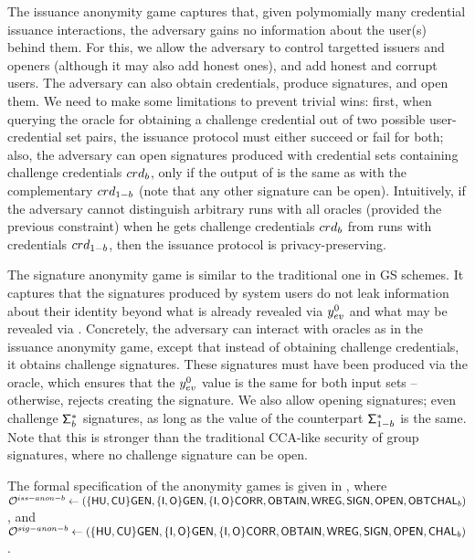 The issuance anonymity game captures that, given polymomially many
credential issuance interactions, the adversary gains no information about the
user(s) behind them. For this, we allow the adversary to control targetted
issuers and openers (although it may also add honest ones), and add honest and
corrupt users. The adversary can also obtain credentials, produce signatures,
and open them. We need to make some limitations to prevent trivial wins: first,
when querying the oracle for obtaining a challenge credential out of two
possible user-credential set pairs, the issuance protocol must either succeed or
fail for both; also, the adversary can open signatures produced with credential
sets containing challenge credentials $crd_b$, only if the output of \Open is
the same as with the complementary $crd_{1-b}$ 
 (note that any other signature
can be open).
Intuitively, if the adversary cannot distinguish arbitrary runs with all oracles
(provided the previous constraint) when he gets challenge credentials $crd_b$
from runs with credentials $crd_{1-b}$, then the issuance protocol is
privacy-preserving.

The signature anonymity game is similar to the traditional one in GS schemes.
It captures that the signatures produced by system users do not leak information
about their identity beyond what is already revealed via $y_{ev}^0$ and what
may be revealed via \yinsp. Concretely, the adversary can interact with oracles
as in the issuance anonymity game, except that instead of obtaining challenge
credentials, it obtains challenge signatures. These signatures must have been
produced via the \CHALb oracle, which ensures that the $y_{ev}^0$ value is the
same for both input sets -- otherwise, rejects creating the signature. We also
allow opening signatures; even challenge $\mathsf{\Sigma}^*_b$ signatures, as long as the
\yinsp value of the counterpart $\mathsf{\Sigma}^*_{1-b}$ is the same. Note that this is
stronger than the traditional CCA-like security of group signatures, where no
challenge signature can be open.

The formal specification of the anonymity games is given in
, where
$\mathcal{O}^{iss-anon-b} \gets (\lbrace\mathsf{HU},\mathsf{CU}\rbrace\mathsf{GEN},\lbrace\mathsf{I},\mathsf{O}\rbrace\mathsf{GEN},\lbrace\mathsf{I},
\mathsf{O}\rbrace\mathsf{CORR},\mathsf{OBTAIN},\mathsf{WREG},\mathsf{SIGN},\mathsf{OPEN},\mathsf{OBTCHAL}_b)$, and $\mathcal{O}^{sig-anon-b}
\gets (\lbrace\mathsf{HU},\mathsf{CU}\rbrace\mathsf{GEN},\lbrace\mathsf{I},\mathsf{O}\rbrace\mathsf{GEN},\lbrace\mathsf{I},\mathsf{O}\rbrace
\mathsf{CORR},\mathsf{OBTAIN},\mathsf{WREG},\mathsf{SIGN},\mathsf{OPEN},\mathsf{CHAL}_b)$.

